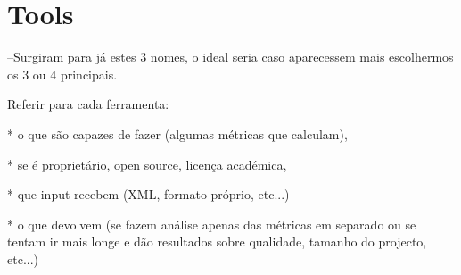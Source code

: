 \section{Tools}

--Surgiram para já estes 3 nomes, o ideal seria caso aparecessem mais escolhermos os 3 ou 4 principais.

Referir para cada ferramenta:

* o que são capazes de fazer (algumas métricas que calculam),

* se é proprietário, open source, licença académica,

* que input recebem (XML, formato próprio, etc...)

* o que devolvem (se fazem análise apenas das métricas em separado ou se tentam ir mais longe e dão resultados sobre qualidade, tamanho do projecto, etc...)
